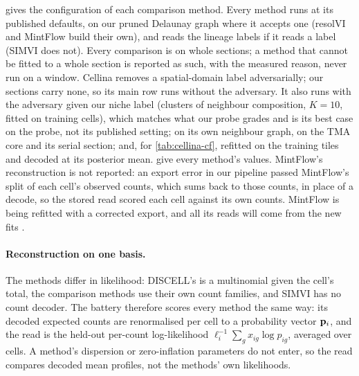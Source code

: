  gives the configuration of each comparison method. Every method runs at its published defaults, on our pruned Delaunay graph where it accepts one (resolVI and MintFlow build their own), and reads the lineage labels if it reads a label (SIMVI does not). Every comparison is on whole sections; a method that cannot be fitted to a whole section is reported as such, with the measured reason, never run on a window. Cellina removes a spatial-domain label adversarially; our sections carry none, so its main row runs without the adversary. It also runs with the adversary given our niche label (clusters of neighbour composition, $K = 10$, fitted on training cells), which matches what our probe grades and is its best case on the probe, not its published setting; on its own neighbour graph, on the TMA core and its serial section; and, for \cref{tab:cellina-cf}, refitted on the training tiles and decoded at its posterior mean.  give every method's values. MintFlow's reconstruction is not reported: an export error in our pipeline passed MintFlow's split of each cell's observed counts, which sums back to those counts, in place of a decode, so the stored read scored each cell against its own counts. MintFlow is being refitted with a corrected export, and all its reads will come from the new fits .

\paragraph{Reconstruction on one basis.} The methods differ in likelihood: DISCELL's is a multinomial given the cell's total, the comparison methods use their own count families, and SIMVI has no count decoder. The battery therefore scores every method the same way: its decoded expected counts are renormalised per cell to a probability vector $\mathbf{p}_i$, and the read is the held-out per-count log-likelihood $\ell_i^{-1}\sum_g x_{ig}\log p_{ig}$, averaged over cells. A method's dispersion or zero-inflation parameters do not enter, so the read compares decoded mean profiles, not the methods' own likelihoods.


